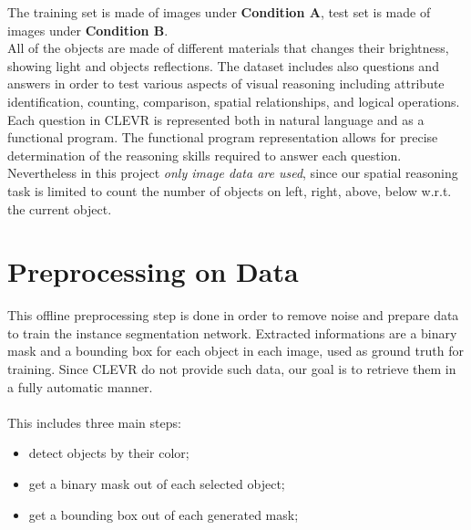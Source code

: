 \documentclass[10pt,twocolumn,letterpaper]{article}
\begin{document}
  The training set is made of images under \textbf{Condition A}, test set is made of
  images under \textbf{Condition B}.
  \\All of the objects are made of different materials that changes their brightness,
   showing light and objects reflections.
  The dataset includes also questions and answers in order to test
   various aspects of visual reasoning including
  attribute identification, counting, comparison, spatial relationships, and logical 
  operations.
  Each question in CLEVR is represented both in natural language and as a functional program.
  The functional program representation allows for precise determination of the
   reasoning skills required to answer each question.
  \\Nevertheless in this project \textit{only image data are used}, since our spatial reasoning task
  is limited to count the number of objects on left, right, above, below w.r.t. the current object.


\section{Preprocessing on Data}
  This offline preprocessing step is done in order to remove noise and prepare
  data to train the instance segmentation network.
  Extracted informations are a binary mask and a bounding box for 
  each object in each image, used as ground truth for training. 
  Since CLEVR do not provide such data, our goal is to retrieve them in 
  a fully automatic manner.\\
  \\ This includes three main steps:
  \begin{itemize}
    \item detect objects by their color;
    \item get a binary mask out of each selected object;
    \item get a bounding box out of each generated mask;
  \end{itemize}
  
\end{document}
